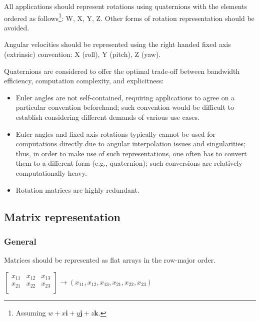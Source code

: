 All applications should represent rotations using quaternions with the elements ordered as follows\footnote{%
    Assuming $w + x\boldsymbol{i} + y\boldsymbol{j} + z\boldsymbol{k}$.
}: W, X, Y, Z.
Other forms of rotation representation should be avoided.

Angular velocities should be represented using the right handed fixed axis (extrinsic) convention:
X (roll), Y (pitch), Z (yaw).

\begin{remark}
    Quaternions are considered to offer the optimal trade-off between bandwidth efficiency,
    computation complexity, and explicitness:
    \begin{itemize}
        \item Euler angles are not self-contained, requiring applications to agree on a particular
        convention beforehand; such convention would be difficult to establish considering different
        demands of various use cases.

        \item Euler angles and fixed axis rotations typically cannot be used for computations directly
        due to angular interpolation issues and singularities; thus, in order to make use of such
        representations, one often has to convert them to a different form (e.g., quaternion);
        such conversions are relatively computationally heavy.

        \item Rotation matrices are highly redundant.
    \end{itemize}
\end{remark}

\subsection{Matrix representation}

\subsubsection{General}

Matrices should be represented as flat arrays in the row-major order.

\begin{remark}
    $
    \begin{bmatrix}
        x_{11} & x_{12} & x_{13} \\
        x_{21} & x_{22} & x_{23} \\
    \end{bmatrix} \rightarrow \left(x_{11}, x_{12}, x_{13}, x_{21}, x_{22}, x_{23}\right)
    $
\end{remark}

